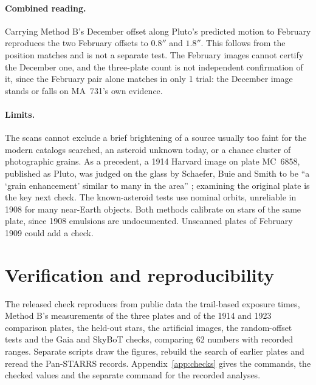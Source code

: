 \documentclass[11pt]{article}
\begin{document}
\paragraph{Combined reading.} Carrying Method B's December offset along Pluto's predicted motion to February reproduces the two February offsets to $0.8''$ and $1.8''$. This follows from the position matches and is not a separate test. The February images cannot certify the December one, and the three-plate count is not independent confirmation of it, since the February pair alone matches in only 1 trial: the December image stands or falls on MA~731's own evidence.

\paragraph{Limits.} The scans cannot exclude a brief brightening of a source usually too faint for the modern catalogs searched, an asteroid unknown today, or a chance cluster of photographic grains. As a precedent, a 1914 Harvard image on plate MC~6858, published as Pluto, was judged on the glass by Schaefer, Buie and Smith to be ``a `grain enhancement' similar to many in the area'' \cite[Section~6]{Schaefer2008}; examining the original plate is the key next check. The known-asteroid tests use nominal orbits, unreliable in 1908 for many near-Earth objects. Both methods calibrate on stars of the same plate, since 1908 emulsions are undocumented. Unscanned plates of February 1909 could add a check.

\section{Verification and reproducibility}
The released check reproduces from public data the trail-based exposure times, Method B's measurements of the three plates and of the 1914 and 1923 comparison plates, the held-out stars, the artificial images, the random-offset tests and the Gaia and SkyBoT checks, comparing 62 numbers with recorded ranges. Separate scripts draw the figures, rebuild the search of earlier plates and reread the Pan-STARRS records. Appendix~\ref{app:checks} gives the commands, the checked values and the separate command for the recorded analyses.
\end{document}
